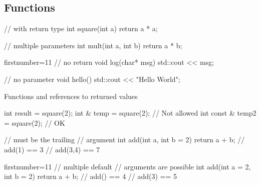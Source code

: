 \subsection[$f()$]{Functions}

\begin{frame}[fragile]
  \begin{multicols}{2}
    \begin{cppcode*}{}
      // with return type
      int square(int a) {
        return a * a;
      }

      // multiple parameters
      int mult(int a,
               int b) {
        return a * b;
      }
    \end{cppcode*}
    \columnbreak
    \begin{cppcode*}{firstnumber=11}
      // no return
      void log(char* msg) {
        std::cout << msg;
      }

      // no parameter
      void hello() {
        std::cout << "Hello World";
      }
    \end{cppcode*}
  \end{multicols}

  \pause

  \begin{exampleblock}{Functions and references to returned values}
    \begin{cppcode}
      int result = square(2);
      int & temp = square(2);        // Not allowed
      int const & temp2 = square(2); // OK
    \end{cppcode}
  \end{exampleblock}
\end{frame}

\begin{frame}[fragile]
  \begin{multicols}{2}
    \begin{cppcode*}{}
      // must be the trailing
      // argument
      int add(int a,
              int b = 2) {
        return a + b;
      }
      // add(1) == 3
      // add(3,4) == 7

    \end{cppcode*}
    \columnbreak
    \begin{cppcode*}{firstnumber=11}
      // multiple default
      // arguments are possible
      int add(int a = 2,
              int b = 2) {
        return a + b;
      }
      // add() == 4
      // add(3) == 5
    \end{cppcode*}
  \end{multicols}
\end{frame}


